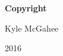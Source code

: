 
\newpage

\thispagestyle{empty}

\vspace*{0.9cm}

\begin{center}

{\bf \Huge Copyright}

\vspace{1cm}


   \Large Kyle McGahee\\

   \vspace{0.5cm}


   2016\\

   \vspace{0.5cm}

\end{center}
